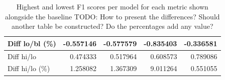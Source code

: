 \begin{table}
\begin{tabular}{lrrrr}
    Diff lo/bl (\%) & -0.557146 & -0.577579 & -0.835403 & -0.336581 \\
    \midrule
    Diff hi/lo & 0.474333 & 0.517964 & 0.608573 & 0.789086 \\
    Diff hi/lo (\%) & 1.258082 & 1.367309 & 9.011264 & 0.551055 \\
    \bottomrule
    \end{tabular}
    \caption{Highest and lowest F1 scores per model for each metric shown alongside the baseline TODO: How to present the differences? Should another table be constructed? Do the percentages add any value?}
    \label{tab:baselines_compared}
\end{table}
